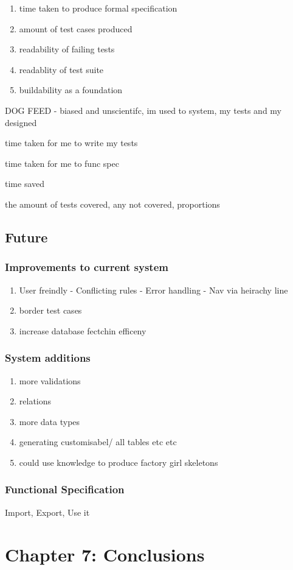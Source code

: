 \documentclass[a4paper,12pt]{article}
\begin{document}
\begin{enumerate}
\item time taken to produce formal specification
\item amount of test cases produced
\item readability of failing tests
\item readablity of test suite
\item buildability as a foundation
\end{enumerate}

\par DOG FEED - biased and unscientifc, im used to system, my tests and my designed
\par time taken for me to write my tests
\par time taken for me to func spec
\par time saved
\par the amount of tests covered, any not covered, proportions

\subsection{Future}

\subsubsection{Improvements to current system}

\begin{enumerate}
\item User freindly - Conflicting rules - Error handling - Nav via heirachy line
\item border test cases
\item increase database fectchin efficeny
\end{enumerate}

\subsubsection{System additions}

\begin{enumerate}
\item more validations
\item relations
\item more data types
\item generating customisabel/ all tables etc etc
\item could use knowledge to produce factory girl skeletons
\end{enumerate}

\subsubsection{Functional Specification}
\par Import, Export, Use it

\section{Chapter 7: Conclusions}






\end{document}
